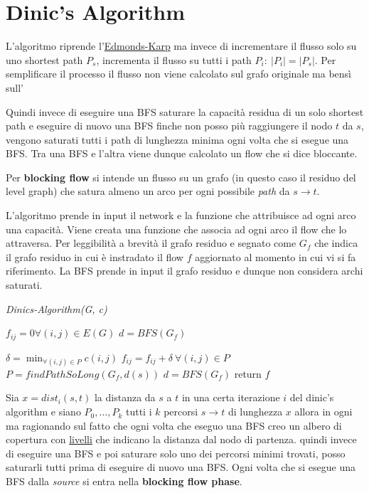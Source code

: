 
\chapter{Dinic's Algorithm} \label{chap:dnc}

L'algoritmo riprende l'\href{https://en.wikipedia.org/wiki/Edmonds%E2%80%93Karp_algorithm}{Edmonds-Karp} ma invece di incrementare il flusso solo su uno shortest path $P_s$, incrementa il flusso su tutti i path $P_i :\ |P_i| = |P_s|$.
Per semplificare il processo il flusso non viene calcolato sul grafo originale ma bensì sull'

Quindi invece di eseguire una BFS saturare la capacità residua di un solo shortest path e eseguire di nuovo una BFS finche non posso più raggiungere il nodo $t$ da $s$, vengono saturati tutti i path di lunghezza minima ogni volta che si esegue una BFS. Tra una BFS e l'altra viene dunque calcolato un flow che si dice bloccante.
\begin{definition}
    Per \textbf{blocking flow} si intende un flusso su un grafo (in questo caso il residuo del level graph) che satura almeno un arco per ogni possibile \textit{path} da $s\rightarrow t$.    
\end{definition}
L'algoritmo prende in input il network e la funzione che attribuisce ad ogni arco una capacità.
Viene creata una funzione che associa ad ogni arco il flow che lo attraversa.
Per leggibilità a brevità il grafo residuo e segnato come $G_f$ che indica il grafo residuo in cui è instradato il flow $f$ aggiornato al momento in cui vi si fa riferimento.
La BFS prende in input il grafo residuo e dunque non considera archi saturati.
\begin{algorithm}
    \caption{\textit{Dinics-Algorithm(G, c)}}
    \label{algotrans}
    \begin{algorithmic}[1]
        \State $f_{ij} = 0 \forall (i,j)\in E(G)$ 
        \State $d =  BFS(G_f)$
        
            \State $\delta = \min_{\forall (i,j)\in P} c(i,j)$
            \State $f_{ij} = f_{ij}+\delta\ \forall (i,j)\in P$
            \State $P = findPathSoLong(G_f,d(s))$
                \State $d =  BFS(G_f)$
            \EndIf
        \EndWhile 
        \State return $f$
    \end{algorithmic}
\end{algorithm}


Sia $x = dist_i(s,t)$ la distanza da $s$ a $t$ in una certa iterazione $i$ del dinic's algorithm e siano $P_0, ..., P_k$ tutti i $k$ percorsi $s\rightarrow t$ di lunghezza $x$ allora in ogni
 ma ragionando sul fatto che ogni volta che eseguo una BFS creo un albero di copertura con \underline{livelli} che indicano la distanza dal nodo di partenza.
quindi invece di eseguire una BFS e poi saturare solo uno dei percorsi minimi trovati, posso saturarli tutti prima di eseguire di nuovo una BFS.
Ogni volta che si esegue una BFS dalla \textit{source} si entra nella \textbf{blocking flow phase}.\\


